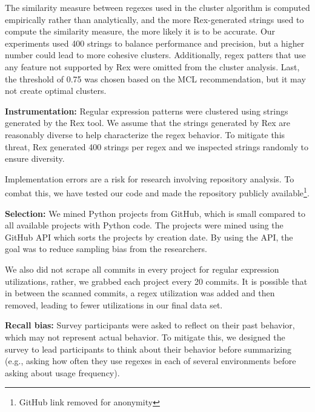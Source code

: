 \documentclass{sig-alternate-05-2015}
\newcommand{\todoNow}[1]{\textbf{\textcolor{red}{TODO.NOW: #1}}} %
\newcommand{\todoMid}[1]{\textbf{\textcolor{magenta}{TODO.MID: #1}}} %
\begin{document}
The similarity measure between regexes used in the cluster algorithm is computed empirically rather than analytically, and the more Rex-generated strings used to compute the similarity measure, the more likely it is to be accurate. Our experiments used 400 strings to balance performance and precision, but a higher number could lead to more cohesive clusters. Additionally, regex patters that use any feature not supported by Rex were omitted from the cluster analysis. Last, the threshold of 0.75 was chosen based on the MCL recommendation, but it may not create optimal clusters. %


\textbf{Instrumentation:} Regular expression patterns were clustered using strings generated by the Rex tool.  We assume that the strings generated by Rex are reasonably diverse to help characterize the regex behavior. To mitigate this threat, Rex generated 400 strings per regex and we inspected strings randomly to ensure diversity.

Implementation errors are a risk for research involving repository analysis. To combat this, we have tested our code and made the repository publicly available\footnote{GitHub link removed for anonymity}.%

\textbf{Selection:} We mined  Python projects from GitHub, which is  small compared to all available projects with Python code. The projects were mined using the GitHub API which sorts the projects by creation date. By using the API, the goal was to reduce  sampling bias from the researchers.

We also did not scrape all commits in every project for regular expression utilizations, rather, we grabbed each project every 20 commits. It is possible that in between the scanned commits, a regex utilization was added and then removed, leading to fewer utilizations in our final data set.

\textbf{Recall bias:} Survey participants were asked to reflect on their past behavior, which may not  represent actual behavior. To mitigate this, we designed the survey to lead participants to think about their behavior before summarizing (e.g., asking how often they use regexes in each of several environments before asking about usage frequency).
\end{document}
